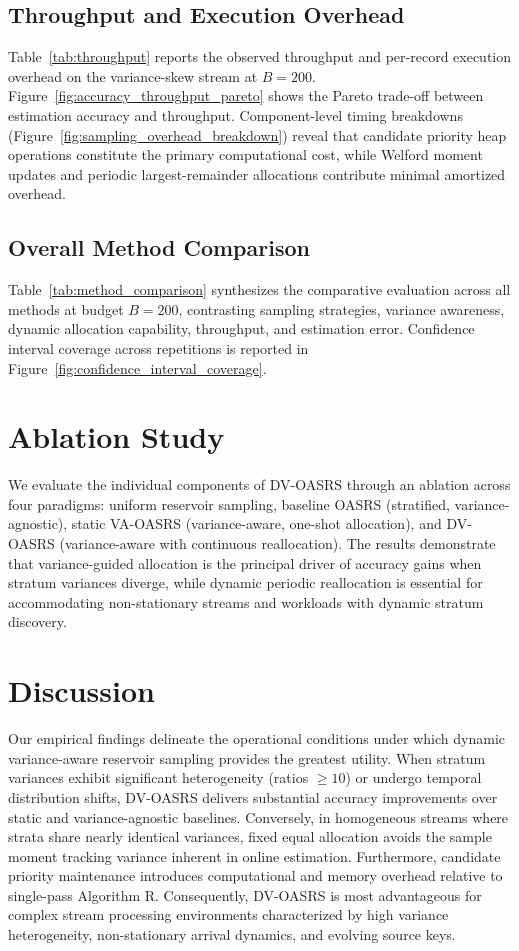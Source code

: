 \documentclass[conference]{IEEEtran}
\begin{document}
\subsection{Throughput and Execution Overhead}

Table~\ref{tab:throughput} reports the observed throughput and per-record execution overhead on the variance-skew stream at $B=200$. Figure~\ref{fig:accuracy_throughput_pareto} shows the Pareto trade-off between estimation accuracy and throughput. Component-level timing breakdowns (Figure~\ref{fig:sampling_overhead_breakdown}) reveal that candidate priority heap operations constitute the primary computational cost, while Welford moment updates and periodic largest-remainder allocations contribute minimal amortized overhead.

\subsection{Overall Method Comparison}

Table~\ref{tab:method_comparison} synthesizes the comparative evaluation across all methods at budget $B=200$, contrasting sampling strategies, variance awareness, dynamic allocation capability, throughput, and estimation error. Confidence interval coverage across repetitions is reported in Figure~\ref{fig:confidence_interval_coverage}.


\section{Ablation Study}

We evaluate the individual components of DV-OASRS through an ablation across four paradigms: uniform reservoir sampling, baseline OASRS (stratified, variance-agnostic), static VA-OASRS (variance-aware, one-shot allocation), and DV-OASRS (variance-aware with continuous reallocation). The results demonstrate that variance-guided allocation is the principal driver of accuracy gains when stratum variances diverge, while dynamic periodic reallocation is essential for accommodating non-stationary streams and workloads with dynamic stratum discovery.


\section{Discussion}

Our empirical findings delineate the operational conditions under which dynamic variance-aware reservoir sampling provides the greatest utility. When stratum variances exhibit significant heterogeneity (ratios $\ge 10$) or undergo temporal distribution shifts, DV-OASRS delivers substantial accuracy improvements over static and variance-agnostic baselines. Conversely, in homogeneous streams where strata share nearly identical variances, fixed equal allocation avoids the sample moment tracking variance inherent in online estimation. Furthermore, candidate priority maintenance introduces computational and memory overhead relative to single-pass Algorithm R. Consequently, DV-OASRS is most advantageous for complex stream processing environments characterized by high variance heterogeneity, non-stationary arrival dynamics, and evolving source keys.
\end{document}
